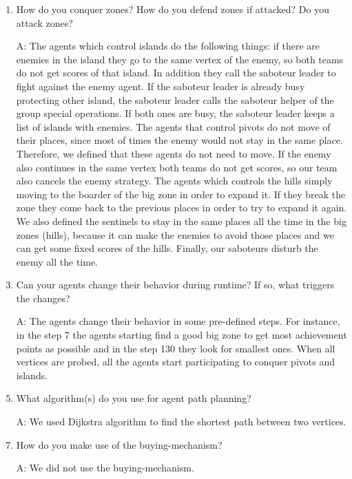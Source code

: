 \begin{enumerate}
\item How do you conquer zones? How do you defend zones if attacked? Do you attack zones?
	\item[A:] The agents which control islands do the following things: if there are enemies in the island they go to the same vertex of the enemy, so both teams do not get scores of that island. In addition they call the saboteur leader to fight against the enemy agent. If the saboteur leader is already busy protecting other island, the saboteur leader calls the saboteur helper of the group special operations. If both ones are busy, the saboteur leader keeps a list of islands with enemies. The agents that control pivots do not move of their places, since most of times the enemy would not stay in the same place. Therefore, we defined that these agents do not need to move. If the enemy also continues in the same vertex both teams do not get scores, so our team also cancels the enemy strategy. The agents which controls the hills simply moving to the boarder of the big zone in order to expand it. If they break the zone they come back to the previous places in order to try to expand it again. We also defined the sentinels to stay in the same places all the time in the big zones (hills), because it can make the enemies to avoid those places and we can get some fixed scores of the hills. Finally, our saboteurs disturb the enemy all the time. \\
	
\item Can your agents change their behavior during runtime? If so, what triggers the changes?
	\item[A:] The agents change their behavior in some pre-defined steps. For instance, in the step 7 the agents starting find a good big zone to get most achievement points as possible and in the step 130 they look for smallest ones. When all vertices are probed, all the agents start participating to conquer pivots and islands.\\
	
	
\item What algorithm(s) do you use for agent path planning?
	\item[A:]  We used Dijkstra algorithm to find the shortest path between two vertices.\\
	
\item How do you make use of the buying-mechanism?
	\item[A:] We did not use the buying-mechanism.\\
	

\end{enumerate}
